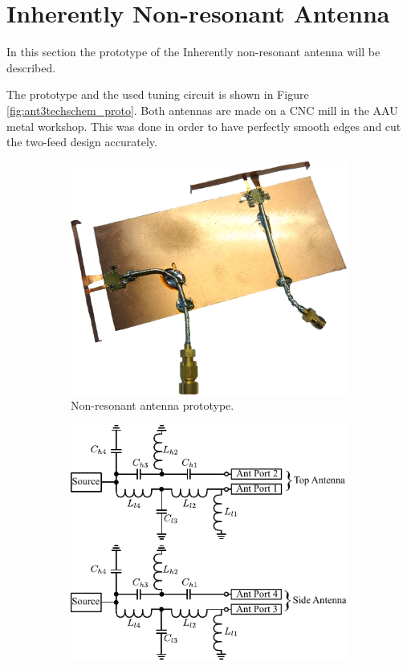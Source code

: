 \section{Inherently Non-resonant Antenna}
In this section the prototype of the Inherently non-resonant antenna will be described.

The prototype and the used tuning circuit is shown in Figure \ref{fig:ant3techschem_proto}. Both antennas are made on a CNC mill in the AAU metal workshop. This was done in order to have perfectly smooth edges and cut the two-feed design accurately.   

\begin{figure}[htbp]
    \begin{subfigure}[b]{0.49\linewidth}
        \centering
        \includegraphics[scale=0.1]{img/tech_sol/nonresonant/prototype/3d_figure.jpg}
        \caption{Non-resonant antenna prototype.}
        \label{fig:nonresonant_proto}
    \end{subfigure}
    \hfill
    \begin{subfigure}[b]{0.49\linewidth}
        \centering
        \includegraphics{img/tech_sol/nonresonant/schematic_tuning}\\[0cm]

\end{subfigure}
\end{figure}
